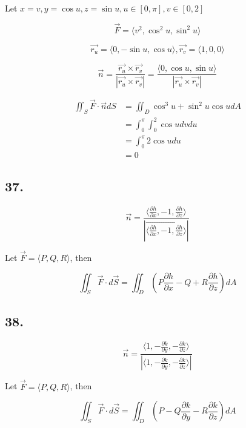 \documentclass{article}
\begin{document}
  Let $x = v, y = \cos u, z = \sin u, u \in [0, \pi], v \in [0, 2]$

  $$\overrightarrow{F} = \langle v^2, \cos^2 u, \sin^2 u \rangle$$

  $$\overrightarrow{r_u} = \langle 0, -\sin u, \cos u \rangle, \overrightarrow{r_v} = \langle 1, 0, 0 \rangle$$

  $$\overrightarrow{n} = \frac{\overrightarrow{r_u} \times \overrightarrow{r_v}}{|\overrightarrow{r_u} \times \overrightarrow{r_v}|} = \frac{\langle 0, \cos u, \sin u \rangle}{|\overrightarrow{r_u} \times \overrightarrow{r_v}|}$$

  $$\begin{aligned}
    \iint_S \overrightarrow{F} \cdot \overrightarrow{n} dS &= \iint_D \cos^3 u + \sin^2 u \cos u dA \\
                                                           &= \int_0^\pi \int_0^2 \cos u dv du \\
                                                           &= \int_0^\pi 2\cos u du \\
                                                           &= 0
  \end{aligned} $$

  \subsection*{37. }

  $$\overrightarrow{n} = \frac{\langle \frac{\partial h}{\partial x}, -1, \frac{\partial h}{\partial z} \rangle}{|\overrightarrow{\langle \frac{\partial h}{\partial x}, -1, \frac{\partial h}{\partial z} \rangle}|}$$

  Let $\overrightarrow{F} = \langle P, Q, R \rangle$, then

  $$\iint_S \overrightarrow{F} \cdot d\overrightarrow{S} = \iint_D (P \frac{\partial h}{\partial x} - Q + R \frac{\partial h}{\partial z}) dA$$

  \subsection*{38. }

  $$\overrightarrow{n} = \frac{\langle 1, -\frac{\partial k}{\partial y}, -\frac{\partial k}{\partial z} \rangle}{|\langle 1, -\frac{\partial k}{\partial y}, -\frac{\partial k}{\partial z} \rangle|}$$
  
  Let $\overrightarrow{F} = \langle P, Q, R \rangle$, then

  $$\iint_S \overrightarrow{F} \cdot d\overrightarrow{S} = \iint_D (P - Q \frac{\partial k}{\partial y} - R \frac{\partial k}{\partial z}) dA$$
\end{document}
